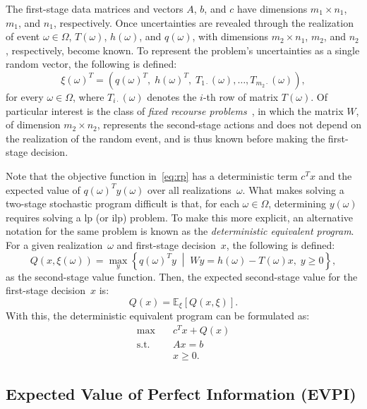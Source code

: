 The first-stage data matrices and vectors $A$, $b$, and $c$ have dimensions
$m_{1} \times n_{1}$, $m_{1}$, and $n_{1}$, respectively. Once uncertainties are
revealed through the realization of event $\omega \in \Omega$, $T(\omega)$,
$h(\omega)$, and $q(\omega)$, with dimensions $m_{2} \times n_{1}$, $m_{2}$, and
$n_{2}$, respectively, become known. To represent the problem's uncertainties as
a single random vector, the following is defined:
\[
	\xi(\omega)^{T} = \left(q(\omega)^{T}, \; h(\omega)^{T}, \; T_{1\cdot}(\omega), \ldots, T_{m_{2}\cdot}(\omega) \right),
\]
for every $\omega \in \Omega$, where $T_{i\cdot}(\omega)$ denotes the $i$-th row
of matrix $T(\omega)$. Of particular interest is the class of \emph{fixed recourse
	problems}~\cite{birge:2011}, in which the matrix $W$, of dimension $m_{2}
	\times n_{2}$, represents the second-stage actions and does not depend on the
realization of the random event, and is thus known before making the first-stage
decision.

Note that the objective function in~\eqref{eq:rp} has a deterministic term
$c^{T}x$ and the expected value of $q(\omega)^{T} y(\omega)$ over all
realizations~$\omega$. What makes solving a two-stage stochastic program
difficult is that, for each $\omega \in \Omega$, determining $y(\omega)$
requires solving a \gls{lp} (or \gls{ilp}) problem. To make this more explicit,
an alternative notation for the same problem is known as the \emph{deterministic
	equivalent program}. For a given realization~$\omega$ and first-stage
decision~$x$, the following is defined:
\[
	Q(x, \xi(\omega)) = \max_{y} \left\{ q(\omega)^{T} y \; \middle| \; W y = h(\omega) - T(\omega) x, \; y \geq 0 \right\},
\]
as the second-stage value function. Then, the expected second-stage value for
the first-stage decision~$x$ is:
\[
	Q(x) = \mathbb{E}_{\xi} \left[ Q(x, \xi) \right].
\]
With this, the deterministic equivalent program can be formulated as:
\begin{align}
	\max \quad        & c^{T} x + Q(x) \nonumber \\
	\text{s.t.} \quad & A x = b \nonumber        \\
	                  & x \geq 0.
	\label{eq:rp_det}
\end{align}

\subsection{Expected Value of Perfect Information (EVPI)}

